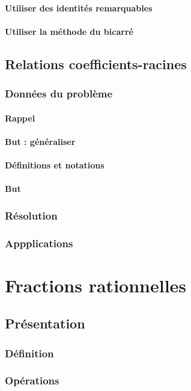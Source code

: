 \documentclass[12pt,a4paper,french]{book}
\begin{document}
			\subsubsection{Utiliser des identités remarquables}
			\subsubsection{Utiliser la méthode du bicarré}
	\section{Relations coefficients-racines}
		\subsection{Données du problème}
			\subsubsection{Rappel}
			\subsubsection{But : généraliser}
			\subsubsection{Définitions et notations}
			\subsubsection{But}
		\subsection{Résolution}
		\subsection{Appplications}
		
\chapter{Fractions rationnelles}
	\section{Présentation}
		\subsection{Définition}
		\subsection{Opérations}
\end{document}
